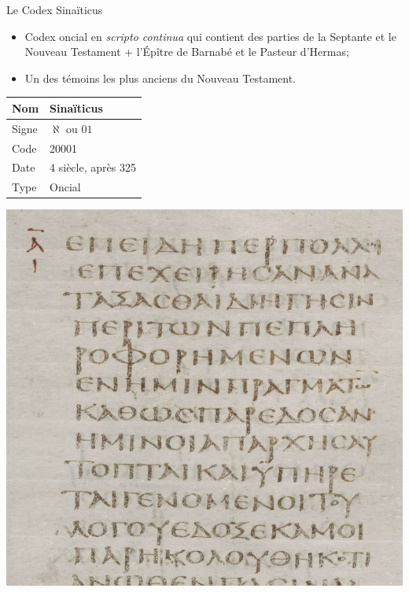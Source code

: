 \documentclass[11pt]{beamer}
\begin{document}
\begin{frame}{Le Codex Sinaïticus}


\begin{block}{}
    \begin{itemize}
        \item Codex oncial en \textit{scripto continua} qui contient des parties de la Septante et le Nouveau Testament + l'Épître de Barnabé et le Pasteur d'Hermas;
        \item Un des témoins les plus anciens du Nouveau Testament.
    \end{itemize}
\end{block}

    \vfill

\begin{minipage}{.45\textwidth}
\begin{tabular}{l|l}
     Nom & Sinaïticus \\
     \hline
     Signe & $\aleph$ ou $01$ \\
     \hline
     Code & 20001\\
     \hline
     Date & 4\ieme{} siècle, après 325 \\
     \hline
     Type & Oncial \\
\end{tabular}
\end{minipage}
\hfill
\begin{minipage}{.45\textwidth}
    \includegraphics[scale=.2]{img/alexandrinus_luke_inscriptio.png}
\end{minipage}
\end{frame}
\end{document}
